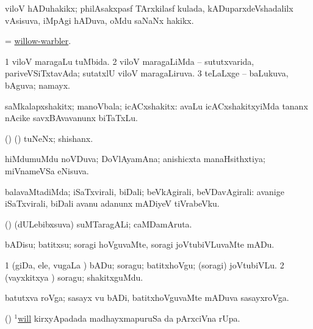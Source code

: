 \bentry
{}
\gl{\nA}
\bmng
viloV hADuhakikx; philAsakxpasf TArxkilasf kulada, kADuparxdeVshadalilx vAsisuva, iMpAgi hADuva, oMdu saNaNx hakikx. 
\emng
\eentry

\bentry
{}
\gl{\nA}
\bmng
= \hyperlink{willow-warbler}{willow-warbler}. 
\emng
\eentry

\bentry
{}
\gl{\gu}
\bmng
\bnum
\num{1} viloV maragaLu tuMbida. 
\num{2} viloV maragaLiMda -- sututxvarida, pariveVSiTxtavAda; sutatxlU viloV maragaLiruva. 
\num{3} teLaLxge -- baLukuva, bAguva; namayx. 
\enum
\emng
\eentry

\bentry
{}
\gl{\nA}
\bmng
saMkalapxshakitx; manoVbala; icACxshakitx:  avaLu icACxshakitxyiMda tananx nAcike savxBAvavanunx biTaTxLu. 
\emng
\eentry

\bentry
{}
\gl{\nA} 
\bmng
(\birx) (\ashi) tuNeNx; shishanx. 
\emng
\eentry

\bentry
{}
\gl{\gu}
\bmng
hiMdumuMdu noVDuva; DoVlAyamAna; anishicxta manaHsithxtiya; miVnameVSa eNisuva. 
\emng
\eentry

\bentry
{}
\gl{\kirxvi}
\bmng
balavaMtadiMda; iSaTxvirali, biDali; beVkAgirali, beVDavAgirali:  avanige iSaTxvirali, biDali avanu adanunx mADiyeV tiVrabeVku. 
\emng
\eentry

\bentry
{}
\gl{\nA} 
\bmng
(\AseTxrXV) (dULebibxsuva) suMTaragALi; caMDamAruta. 
\emng
\eentry

\bentry
{} 
\gl{\sakirx}
\expl{}
\bmng
bADisu; batitxsu; soragi hoVguvaMte, soragi joVtubiVLuvaMte mADu. 
\emng

\noindent
\gl{\akirx}
\expl{}
\bmng
\bnum
\num{1} (giDa, ele, \mo vugaLa \vi) bADu; soragu; batitxhoVgu; (soragi) joVtubiVLu. 
\num{2} (vayxkitxya \vi) soragu; shakitxguMdu. 
\enum
\emng
\eentry

\bentry
{} 
\gl{\nA}
\expl{}
\bmng
batutxva roVga; sasayx \mo vu bADi, batitxhoVguvaMte mADuva sasayxroVga. 
\emng
\eentry

\bentry
{} 
\gl{\kirx}
\expl{}
\bmng
(\pArxparx) \hyperlink{will(1)}{$^1$will} kirxyApadada madhayxmapuruSa \Eva da pArxciVna rUpa. 
\emng
\eentry

